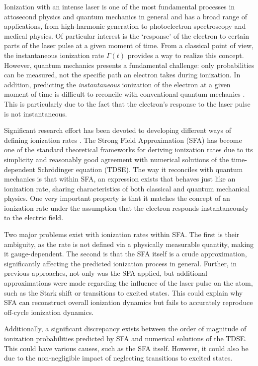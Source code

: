 Ionization with an intense laser is one of the most fundamental processes in attosecond physics and quantum mechanics in general and has a broad range of applications, from high-harmonic generation to photoelectron spectroscopy and medical physics.
Of particular interest is the `response' of the electron to certain parts of the laser pulse at a given moment of time.
From a classical point of view, the instantaneous ionization rate $\Gamma(t)$ provides a way to realize this concept.
However, quantum mechanics presents a fundamental challenge: only probabilities can be measured, not the specific path an electron takes during ionization.
In addition, predicting the \emph{instantaneous} ionization of the electron at a given moment of time is difficult to reconcile with conventional quantum mechanics \cite{Ivanov2018}.
This is particularly due to the fact that the electron's response to the laser pulse is not instantaneous.

\medskip
Significant research effort has been devoted to developing different ways of defining ionization rates \cite{agarwal2025generalapproximatorstrongfieldionization,Ivanov2018}.
The Strong Field Approximation (SFA) has become one of the standard theoretical frameworks for deriving ionization rates due to its simplicity and reasonably good agreement with numerical solutions of the time-dependent Schrödinger equation (TDSE).
The way it reconciles with quantum mechanics is that within SFA, an expression exists that behaves just like an ionization rate, sharing characteristics of both classical and quantum mechanical physics.
One very important property is that it matches the concept of an ionization rate under the assumption that the electron responds instantaneously to the electric field.

\medskip
Two major problems exist with ionization rates within SFA.
The first is their ambiguity, as the rate is not defined via a physically measurable quantity, making it gauge-dependent.
The second is that the SFA itself is a crude approximation, significantly affecting the predicted ionization process in general.
Further, in previous approaches, not only was the SFA applied, but additional approximations were made regarding the influence of the laser pulse on the atom, such as the Stark shift or transitions to excited states.
This could explain why SFA can reconstruct overall ionization dynamics but fails to accurately reproduce off-cycle ionization dynamics.

\medskip
Additionally, a significant discrepancy exists between the order of magnitude of ionization probabilities predicted by SFA and numerical solutions of the TDSE.
This could have various causes, such as the SFA itself.
However, it could also be due to the non-negligible impact of neglecting transitions to excited states.

